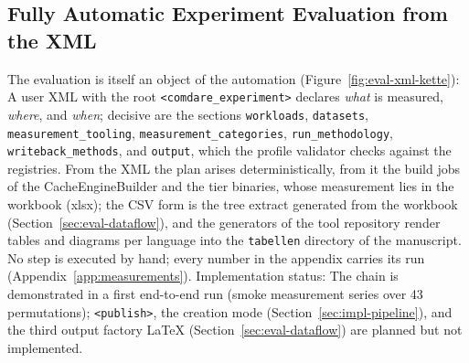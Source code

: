\begin{nurkurz}
\subsection{Fully Automatic Experiment Evaluation from the XML}\label{sec:eval-xml}
The evaluation is itself an object of the automation (Figure~\ref{fig:eval-xml-kette}): A user XML with the
root \texttt{<comdare\_experiment>} declares \emph{what} is measured, \emph{where}, and \emph{when}; decisive
are the sections \texttt{workloads}, \texttt{datasets}, \texttt{measurement\_tooling},
\texttt{measurement\_categories}, \texttt{run\_methodology}, \texttt{writeback\_methods}, and
\texttt{output}, which the profile validator checks against the registries. From the XML the plan arises
deterministically, from it the build jobs of the CacheEngineBuilder and the tier binaries, whose measurement
lies in the workbook (xlsx); the CSV form is the tree extract generated from the workbook
(Section~\ref{sec:eval-dataflow}), and the generators of the tool repository render tables and diagrams per
language into the \texttt{tabellen} directory of the manuscript. No step is executed by hand; every number in
the appendix carries its run (Appendix~\ref{app:measurements}). Implementation status: The chain is
demonstrated in a first end-to-end run (smoke measurement series over 43 permutations);
\texttt{<publish>}, the creation mode (Section~\ref{sec:impl-pipeline}), and the third output factory LaTeX
(Section~\ref{sec:eval-dataflow}) are planned but not implemented.
\begin{figure}[htbp]\centering
{}
\end{figure}
\end{nurkurz}
